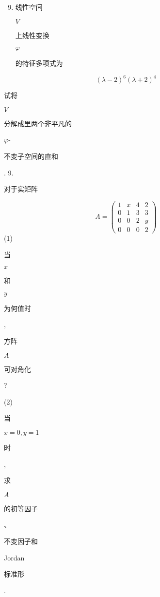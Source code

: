 \documentclass[10pt]{article}
\begin{document}
\begin{enumerate}
  \setcounter{enumi}{8}
  \item \begin{CJK}{UTF8}{mj}线性空间\end{CJK} $V$ \begin{CJK}{UTF8}{mj}上线性变换\end{CJK} $\varphi$ \begin{CJK}{UTF8}{mj}的特征多项式为\end{CJK}
\end{enumerate}
$$
(\lambda-2)^{6}(\lambda+2)^{4}
$$
\begin{CJK}{UTF8}{mj}试将\end{CJK} $V$ \begin{CJK}{UTF8}{mj}分解成里两个非平凡的\end{CJK} $\varphi$-\begin{CJK}{UTF8}{mj}不变子空间的直和\end{CJK}. 9. \begin{CJK}{UTF8}{mj}对于实矩阵\end{CJK}
$$
A=\left(\begin{array}{llll}
1 & x & 4 & 2 \\
0 & 1 & 3 & 3 \\
0 & 0 & 2 & y \\
0 & 0 & 0 & 2
\end{array}\right)
$$
(1) \begin{CJK}{UTF8}{mj}当\end{CJK} $x$ \begin{CJK}{UTF8}{mj}和\end{CJK} $y$ \begin{CJK}{UTF8}{mj}为何值时\end{CJK}, \begin{CJK}{UTF8}{mj}方阵\end{CJK} $A$ \begin{CJK}{UTF8}{mj}可对角化\end{CJK}?

(2) \begin{CJK}{UTF8}{mj}当\end{CJK} $x=0, y=1$ \begin{CJK}{UTF8}{mj}时\end{CJK}, \begin{CJK}{UTF8}{mj}求\end{CJK} $A$ \begin{CJK}{UTF8}{mj}的初等因子\end{CJK}、\begin{CJK}{UTF8}{mj}不变因子和\end{CJK} Jordan \begin{CJK}{UTF8}{mj}标准形\end{CJK}.
\end{document}
